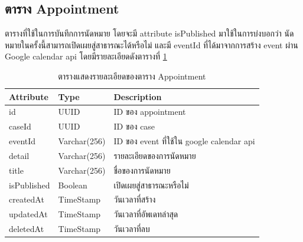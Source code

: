 \documentclass[12pt,oneside,openright,a4paper]{cpe-thai-project}
\begin{document}
\subsection{ตาราง Appointment}
ตารางที่ใช้ในการบันทึกการนัดหมาย โดยจะมี attribute isPublished มาใช้ในการบ่งบอกว่า นัดหมายในครั้งนี้สามารถเปิดเผยสู่สาธารณะได้หรือไม่ และมี eventId ที่ได้มาจากการสร้าง event ผ่าน Google calendar api โดยมีรายละเอียดดังตารางที่  \ref{tbl:dbAppointment}
\begin{table}[!ht]
    \centering
    \begin{tabular}{|p{4cm}|p{2cm}|p{6cm}|}
    \hline
    \textbf{Attribute} & \textbf{Type} & \textbf{Description}   \\ \hline
    id          & UUID        & ID ของ appointment                        \\ \hline
    caseId      & UUID        & ID ของ case                               \\ \hline
    eventId     & Varchar(256) & ID ของ event ที่ใช้ใน google calendar api \\ \hline
    detail      & Varchar(256) & รายละเอียดของการนัดหมาย                   \\ \hline
    title       & Varchar(256) & ชื่อของการนัดหมาย                         \\ \hline
    isPublished & Boolean        & เปิดเผยสู่สาธารณะหรือไม่                  \\ \hline
    createdAt   & TimeStamp   & วันเวลาที่สร้าง                           \\ \hline
    updatedAt   & TimeStamp   & วันเวลาที่อัพเดทล่าสุด                    \\ \hline
    deletedAt   & TimeStamp   & วันเวลาที่ลบ             \\ \hline
    \end{tabular}
    \caption{\centering  ตารางแสดงรายละเอียดของตาราง Appointment} \label{tbl:dbAppointment}
\end{table}

\newpage
\end{document}
